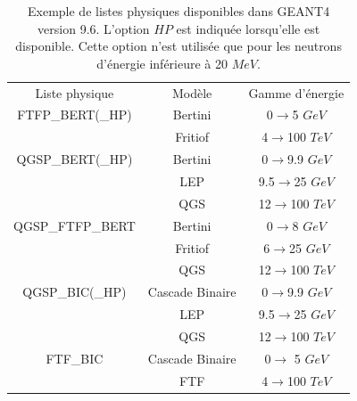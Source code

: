 \begin{table}[!ht]
  \begin{center}
    \begin{tabular}{c|c|c}
      \rowcolor{black!20!white}Liste physique & Modèle & Gamme d'énergie \\
      \rowcolor{black!5!white}\hline
      \rowcolor{black!5!white}FTFP\_BERT(\_HP) & Bertini & 0$\rightarrow$5 $GeV$\\
      \rowcolor{black!5!white}$ $        & Fritiof & 4$\rightarrow$100 $TeV$\\
      \rowcolor{black!5!white}\hline
      \rowcolor{black!5!white}QGSP\_BERT(\_HP) & Bertini & 0$\rightarrow$9.9 $GeV$\\
      \rowcolor{black!5!white}$ $        & LEP & 9.5$\rightarrow$25 $GeV$\\
      \rowcolor{black!5!white}$ $        & QGS & 12$\rightarrow$100 $TeV$\\
      \rowcolor{black!5!white}\hline
      \rowcolor{black!5!white}QGSP\_FTFP\_BERT & Bertini & 0$\rightarrow$8 $GeV$\\
      \rowcolor{black!5!white}$ $              & Fritiof & 6$\rightarrow$25 $GeV$\\
      \rowcolor{black!5!white}$ $              & QGS & 12$\rightarrow$100 $TeV$\\
      \rowcolor{black!5!white}\hline
      \rowcolor{black!5!white}QGSP\_BIC(\_HP) & Cascade Binaire & 0$\rightarrow$9.9 $GeV$\\
      \rowcolor{black!5!white}$ $             & LEP & 9.5$\rightarrow$25 $GeV$\\
      \rowcolor{black!5!white}$ $             & QGS & 12$\rightarrow$100 $TeV$\\
      \rowcolor{black!5!white}\hline
      \rowcolor{black!5!white}FTF\_BIC  & Cascade Binaire & 0$\rightarrow$ 5 $GeV$\\
      \rowcolor{black!5!white}$ $       & FTF & 4$\rightarrow$100 $TeV$\\
    \end{tabular}
  \end{center}
  \caption{Exemple de listes physiques disponibles dans GEANT4 version 9.6. L'option $HP$ est indiquée lorsqu'elle est disponible. Cette option n'est utilisée que pour les neutrons d'énergie inférieure à 20 $MeV$.}
  \label{tab.physList}
\end{table}


